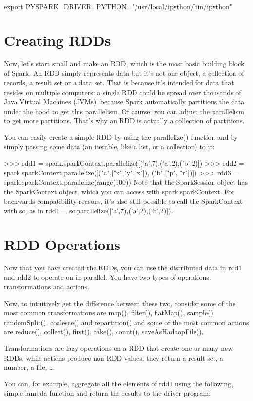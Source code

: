 \documentclass[a4paper,12pt]{article}
\begin{document}
export PYSPARK_DRIVER_PYTHON="/usr/local/ipython/bin/ipython"
\section*{Creating RDDs}
Now, let’s start small and make an RDD, which is the most basic building block of Spark. An RDD simply represents data but it’s not one object, a collection of records, a result set or a data set. That is because it’s intended for data that resides on multiple computers: a single RDD could be spread over thousands of Java Virtual Machines (JVMs), because Spark automatically partitions the data under the hood to get this parallelism. Of course, you can adjust the parallelism to get more partitions. That’s why an RDD is actually a collection of partitions.

You can easily create a simple RDD by using the parallelize() function and by simply passing some data (an iterable, like a list, or a collection) to it:

>>> rdd1 = spark.sparkContext.parallelize([('a',7),('a',2),('b',2)])
>>> rdd2 = spark.sparkContext.parallelize([("a",["x","y","z"]), ("b",["p", "r"])])
>>> rdd3 = spark.sparkContext.parallelize(range(100))
Note that the SparkSession object has the SparkContext object, which you can access with spark.sparkContext. For backwards compatibility reasons, it’s also still possible to call the SparkContext with sc, as in rdd1 = sc.parallelize(['a',7),('a',2),('b',2)]).

\section*{RDD Operations}
Now that you have created the RDDs, you can use the distributed data in rdd1 and rdd2 to operate on in parallel. You have two types of operations: transformations and actions.

Now, to intuitively get the difference between these two, consider some of the most common transformations are map(), filter(), flatMap(), sample(), randomSplit(), coalesce() and repartition() and some of the most common actions are reduce(), collect(), first(), take(), count(), saveAsHadoopFile().

Transformations are lazy operations on a RDD that create one or many new RDDs, while actions produce non-RDD values: they return a result set, a number, a file, …

You can, for example, aggregate all the elements of rdd1 using the following, simple lambda function and return the results to the driver program:
\end{document}
